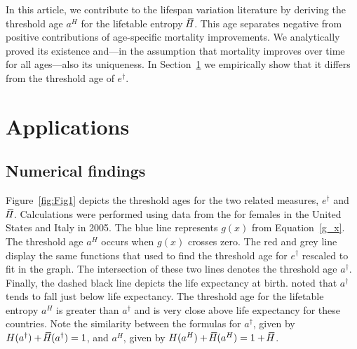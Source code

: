 \documentclass[a4paper,twoside, openright, 12pt, leqno]{article}
\newcommand*\xbar[1]{%
   \hbox{%
     \vbox{%
       \hrule height 0.5pt %
       \kern0.3ex%
       \hbox{%
         \kern-0.28em%
         \ensuremath{#1}%
         \kern-0.05em%
       }%
     }%
   }%
}
\begin{document}
In this article, we contribute to the lifespan variation literature by deriving the threshold age $a^H$ for the lifetable entropy $\,\xbar{H}$. This age separates negative from positive contributions of age-specific mortality improvements. We analytically proved its existence and---in the assumption that mortality improves over time for all ages---also its uniqueness. In Section~\ref{sec:application} we empirically show that it differs from the threshold age of $e^\dagger$.


\section{Applications}
\label{sec:application}

\subsection{Numerical findings}

Figure~\ref{fig:Fig1} depicts the threshold ages for the two related measures, $e^\dagger$ and $\,\xbar{H}$. Calculations were performed using data from the \citet{HMD} for females in the United States and Italy in 2005. The blue line represents $g(x)$ from Equation~\eqref{g_x}. The threshold age $a^H$ occurs when  $g(x)$ crosses zero. The red and grey line display the same functions that \cite{Zhang2009} used to find the threshold age for $e^\dagger$ rescaled to fit in the graph. The intersection of these two lines denotes the threshold age $a^\dagger$. Finally, the dashed black line depicts the life expectancy at birth. \citet{Vaupel2011} noted that $a^\dagger$ tends to fall just below life expectancy. The threshold age for the lifetable entropy $a^H$ is greater than $a^\dagger$ and is very close above life expectancy for these countries. Note the similarity between the formulas for $a^\dagger$, given by $H(a^\dagger)+\,\xbar{H}(a^\dagger)=1$, and $a^H$, given by $H(a^H)+\,\xbar{H}(a^H)= 1+\,\xbar{H}$.
\end{document}
